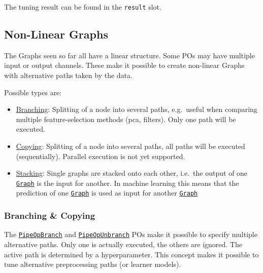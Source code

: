 \documentclass[]{article}
\newenvironment{Shaded}{\begin{snugshade}}{\end{snugshade}}
\newcommand{\NormalTok}[1]{#1}
\newcommand{\OperatorTok}[1]{\textcolor[rgb]{0.81,0.36,0.00}{\textbf{#1}}}
\providecommand{\tightlist}{%
  \setlength{\itemsep}{0pt}\setlength{\parskip}{0pt}}
\renewenvironment{Shaded} {\begin{snugshade}\small} {\end{snugshade}}
\begin{document}
The tuning result can be found in the \texttt{result} slot.

\begin{Shaded}
\end{Shaded}

\hypertarget{pipe-nonlinear}{%
\subsection{Non-Linear Graphs}\label{pipe-nonlinear}}

The Graphs seen so far all have a linear structure.
Some POs may have multiple input or output channels.
These make it possible to create non-linear Graphs with alternative paths taken by the data.

Possible types are:

\begin{itemize}
\tightlist
\item
  \protect\hyperlink{pipe-model-ensembles-branching}{Branching}:
  Splitting of a node into several paths, e.g.~useful when comparing multiple feature-selection methods (pca, filters).
  Only one path will be executed.
\item
  \protect\hyperlink{pipe-model-ensembles-copying}{Copying}:
  Splitting of a node into several paths, all paths will be executed (sequentially).
  Parallel execution is not yet supported.
\item
  \protect\hyperlink{pipe-model-ensembles-stacking}{Stacking}:
  Single graphs are stacked onto each other, i.e.~the output of one \href{https://mlr3pipelines.mlr-org.com/reference/Graph.html}{\texttt{Graph}} is the input for another.
  In machine learning this means that the prediction of one \href{https://mlr3pipelines.mlr-org.com/reference/Graph.html}{\texttt{Graph}} is used as input for another \href{https://mlr3pipelines.mlr-org.com/reference/Graph.html}{\texttt{Graph}}
\end{itemize}

\hypertarget{pipe-model-ensembles-branching-copying}{%
\subsubsection{Branching \& Copying}\label{pipe-model-ensembles-branching-copying}}

The \href{https://mlr3pipelines.mlr-org.com/reference/mlr_pipeops_branch.html}{\texttt{PipeOpBranch}} and \href{https://mlr3pipelines.mlr-org.com/reference/mlr_pipeops_unbranch.html}{\texttt{PipeOpUnbranch}} POs make it possible to specify multiple alternative paths.
Only one is actually executed, the others are ignored.
The active path is determined by a hyperparameter.
This concept makes it possible to tune alternative preprocessing paths (or learner models).
\end{document}
